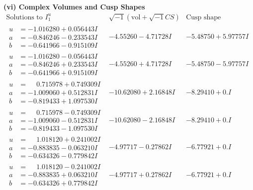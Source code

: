 \documentclass[1p]{elsarticle_modified}
\theoremstyle{definition}
\newcommand{\I}{\sqrt{-1}}
\begin{document}
\newpage\flushleft \textbf{(vi) Complex Volumes and Cusp Shapes}
$$\begin{array}{c|c|c}  
\text{Solutions to }I^u_{1}& \I (\text{vol} + \sqrt{-1}CS) & \text{Cusp shape}\\
 \hline 
\begin{aligned}
u &= -1.016280 + 0.056443 I \\
a &= -0.846246 - 0.233543 I \\
b &= -0.641966 - 0.915109 I\end{aligned}
 & -4.55260 - 4.71728 I & -5.48750 + 5.97757 I \\ \hline\begin{aligned}
u &= -1.016280 - 0.056443 I \\
a &= -0.846246 + 0.233543 I \\
b &= -0.641966 + 0.915109 I\end{aligned}
 & -4.55260 + 4.71728 I & -5.48750 - 5.97757 I \\ \hline\begin{aligned}
u &= \phantom{-}0.715978 + 0.749309 I \\
a &= -1.009060 + 0.512831 I \\
b &= -0.819433 + 1.097530 I\end{aligned}
 & -10.62080 + 2.16848 I & -8.29410 + 0. I\phantom{ +0.000000I} \\ \hline\begin{aligned}
u &= \phantom{-}0.715978 - 0.749309 I \\
a &= -1.009060 - 0.512831 I \\
b &= -0.819433 - 1.097530 I\end{aligned}
 & -10.62080 - 2.16848 I & -8.29410 + 0. I\phantom{ +0.000000I} \\ \hline\begin{aligned}
u &= \phantom{-}1.018120 + 0.241002 I \\
a &= -0.883835 - 0.063210 I \\
b &= -0.634326 - 0.779842 I\end{aligned}
 & -4.97717 - 0.27862 I & -6.77921 + 0. I\phantom{ +0.000000I} \\ \hline\begin{aligned}
u &= \phantom{-}1.018120 - 0.241002 I \\
a &= -0.883835 + 0.063210 I \\
b &= -0.634326 + 0.779842 I\end{aligned}
 & -4.97717 + 0.27862 I & -6.77921 + 0. I\phantom{ +0.000000I} \\ \hline\begin{aligned}

\end{aligned}
\end{array}$$
\end{document}
